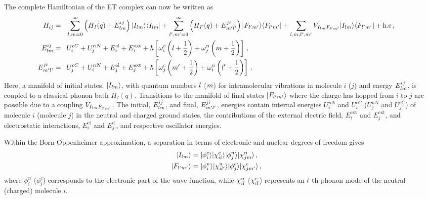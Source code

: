 The complete Hamiltonian of the ET complex can now be written as
\begin{equation}
\begin{split}
 H_{ij}=&\hphantom{+}\sum_{\indM,\indN=0}^\infty \left( H_I(q) + E^{ij}_{\indM\indN} \right) \rb{I_{\indM\indN}} \lb{I_{\indM\indN}} %
        +\sum_{\indM',\indN'=0}^\infty \left( H_F(q) + E^{ji}_{\indN'\indM'} \right) \rb{F_{\indM'\indN'}} \lb{F_{\indM'\indN'}} %
        +\sum_{\indM,\indN,\indM',\indN'}V_{I_{\indM\indN}F_{\indM'\indN'}} \rb{I_{\indM\indN}} \lb{F_{\indM'\indN'}} +\text{h.c} \,, \\
 E^{ij}_{\indM\indN}=& \hphantom{+} U_i^{cC} + U_j^{nN} + E_i^\text{el} + E_i^\text{ext}
+ \hbar\left[\omega_i^c\left(\indM+\frac{1}{2}\right) + \omega_j^n\left(\indN+\frac{1}{2}\right) \right] \, , 
       \\
 E^{ji}_{\indN'\indM'}=&\hphantom{+} U_j^{cC} + U_i^{nN} + E_j^\text{el} + E_j^\text{ext} 
+ \hbar\left[\omega_j^c\left(\indN'+\frac{1}{2}\right) +\omega_i^n\left(\indM'+\frac{1}{2}\right)\right] \, .
\end{split}
\label{equ:hami}
\end{equation}
Here, a manifold of initial states, $| I_{l m} \rangle $, with quantum numbers $l$ ($m$) for intramolecular vibrations in molecule $i$ ($j$) and energy $E^{ij}_{l m}$, is coupled to a classical phonon bath $H_I(q)$. Transitions to the manifold of final states  $| F_{l' m'} \rangle $ where the charge has hopped from $i$ to $j$ are possible due to a coupling $V_{I_{lm}F_{l'm'}} $.
The initial, $E^{ij}_{lm}$,  and final, $E^{ji}_{m'l'}$, energies contain internal energies $U_i^{nN}$ and $U_i^{cC}$ ($U_j^{nN}$ and $U_j^{cC}$) of molecule $i$ (molecule $j$) in the neutral and charged ground states, the contributions of the external electric field, $E_i^\text{ext}$ and $E_j^\text{ext}$, and electrostatic interactions, $E_i^\text{el}$ and $E_j^\text{el}$, and respective oscillator energies.  

Within the Born-Oppenheimer approximation, a separation in terms of electronic and nuclear degrees of freedom gives
\begin{equation}
\begin{split}
 | I_{lm} \rangle&=| \phi_i^c \rangle| \chi_{il}^c \rangle| \phi_j^n \rangle| \chi^n_{jm} \rangle\, ,\\
 | F_{l'm'} \rangle&=| \phi^n_i \rangle| \chi^n_{il'} \rangle| \phi_j^c \rangle| \chi_{jm'}^c \rangle\, ,
\end{split}
\end{equation}
where $\phi_i^n$ ($\phi_i^c$) corresponds to the electronic part of the wave function, while $\chi_{il}^n$  ($\chi_{il}^c$) represents an $l$-th phonon mode of the neutral (charged) molecule $i$.

